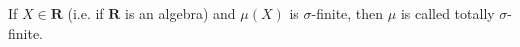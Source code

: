 If $X \in \mathbf{R}$ (i.e. if $\mathbf{R}$ is an algebra) and $\mu(X)$ is $\sigma$-finite, then $\mu$ is called totally $\sigma$-finite.
